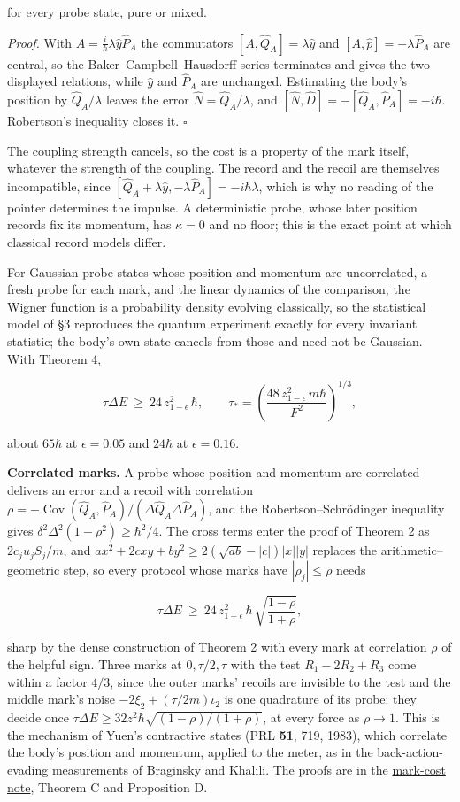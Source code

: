 \documentclass[11pt,a4paper]{article}
\begin{document}
for every probe state, pure or mixed.

\emph{Proof.} With \(A=\tfrac{i}{\hbar}\lambda\hat y\hat P_A\) the
commutators \([A,\hat Q_A]=\lambda\hat y\) and
\([A,\hat p]=-\lambda\hat P_A\) are central, so the
Baker--Campbell--Hausdorff series terminates and gives the two displayed
relations, while \(\hat y\) and \(\hat P_A\) are unchanged. Estimating
the body's position by \(\hat Q_A/\lambda\) leaves the error
\(\hat N=\hat Q_A/\lambda\), and
\([\hat N,\hat D]=-[\hat Q_A,\hat P_A]=-i\hbar\). Robertson's inequality
closes it. \(\square\)

The coupling strength cancels, so the cost is a property of the mark
itself, whatever the strength of the coupling. The record and the recoil
are themselves incompatible, since
\([\hat Q_A+\lambda\hat y,-\lambda\hat P_A]=-i\hbar\lambda\), which is
why no reading of the pointer determines the impulse. A deterministic
probe, whose later position records fix its momentum, has \(\kappa=0\)
and no floor; this is the exact point at which classical record models
differ.

For Gaussian probe states whose position and momentum are uncorrelated,
a fresh probe for each mark, and the linear dynamics of the comparison,
the Wigner function is a probability density evolving classically, so
the statistical model of §3 reproduces the quantum experiment exactly
for every invariant statistic; the body's own state cancels from those
and need not be Gaussian. With Theorem 4,

\[\tau\Delta E\ \ge\ 24\,z_{1-\epsilon}^2\,\hbar,\qquad
\tau_*=\left(\frac{48\,z_{1-\epsilon}^2\,m\hbar}{F^2}\right)^{1/3}, \tag{2}\]

about \(65\hbar\) at \(\epsilon=0.05\) and \(24\hbar\) at
\(\epsilon=0.16\).

\textbf{Correlated marks.} A probe whose position and momentum are
correlated delivers an error and a recoil with correlation
\(\rho=-\operatorname{Cov}(\hat Q_A,\hat P_A)/(\Delta\hat Q_A\Delta\hat P_A)\),
and the Robertson--Schrödinger inequality gives
\(\delta^2\Delta^2(1-\rho^2)\ge\hbar^2/4\). The cross terms enter the
proof of Theorem 2 as \(2c_ju_jS_j/m\), and
\(ax^2+2cxy+by^2\ge2(\sqrt{ab}-|c|)|x||y|\) replaces the
arithmetic--geometric step, so every protocol whose marks have
\(|\rho_j|\le\rho\) needs

\[\tau\Delta E\ \ge\ 24\,z_{1-\epsilon}^2\,\hbar\,\sqrt{\frac{1-\rho}{1+\rho}} , \tag{3}\]

sharp by the dense construction of Theorem 2 with every mark at
correlation \(\rho\) of the helpful sign. Three marks at
\(0,\tau/2,\tau\) with the test \(R_1-2R_2+R_3\) come within a factor
\(4/3\), since the outer marks' recoils are invisible to the test and
the middle mark's noise \(-2\xi_2+(\tau/2m)\iota_2\) is one quadrature
of its probe: they decide once
\(\tau\Delta E\ge32z^2\hbar\sqrt{(1-\rho)/(1+\rho)}\), at every force as
\(\rho\to1\). This is the mechanism of Yuen's contractive states (PRL
\textbf{51}, 719, 1983), which correlate the body's position and
momentum, applied to the meter, as in the back-action-evading
measurements of Braginsky and Khalili. The proofs are in the
\href{mark-cost-and-statistical-floor.md}{mark-cost note}, Theorem C and
Proposition D.
\end{document}
